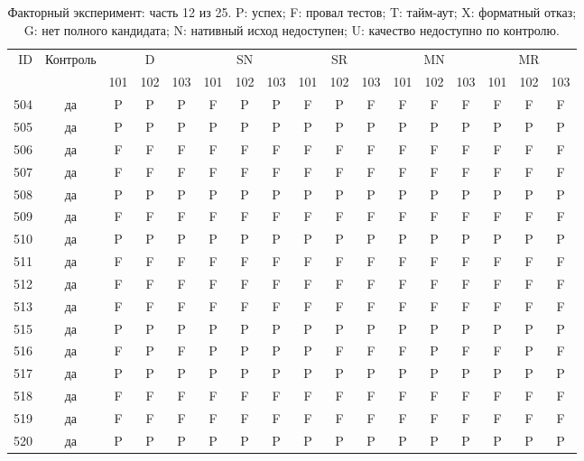 \begin{table}[p]\centering\footnotesize
\setlength{\tabcolsep}{3pt}
\caption{Факторный эксперимент: часть 12 из 25. P: успех; F: провал тестов; T: тайм-аут; X: форматный отказ; G: нет полного кандидата; N: нативный исход недоступен; U: качество недоступно по контролю.}
\begin{tabular*}{\textwidth}{@{\extracolsep{\fill}}rcccccccccccccccc}\toprule
ID & Контроль & \multicolumn{3}{c}{D} & \multicolumn{3}{c}{SN} & \multicolumn{3}{c}{SR} & \multicolumn{3}{c}{MN} & \multicolumn{3}{c}{MR}\\
\cmidrule(lr){3-5}\cmidrule(lr){6-8}\cmidrule(lr){9-11}\cmidrule(lr){12-14}\cmidrule(lr){15-17}
 & & 101 & 102 & 103 & 101 & 102 & 103 & 101 & 102 & 103 & 101 & 102 & 103 & 101 & 102 & 103\\\midrule
504 & да & P & P & P & F & P & P & F & P & F & F & F & F & F & F & F\\
505 & да & P & P & P & P & P & P & P & P & P & P & P & P & P & P & P\\
506 & да & F & F & F & F & F & F & F & F & F & F & F & F & F & F & F\\
507 & да & F & F & F & F & F & F & F & F & F & F & F & F & F & F & F\\
508 & да & P & P & P & P & P & P & P & P & P & P & P & P & P & P & P\\
509 & да & F & F & F & F & F & F & F & F & F & F & F & F & F & F & F\\
510 & да & P & P & P & P & P & P & P & P & P & P & P & P & P & P & P\\
511 & да & F & F & F & F & F & F & F & F & F & F & F & F & F & F & F\\
512 & да & F & F & F & F & F & F & F & F & F & F & F & F & F & F & F\\
513 & да & F & F & F & F & F & F & F & F & F & F & F & F & F & F & F\\
515 & да & P & P & P & P & P & P & P & P & P & P & P & P & P & P & P\\
516 & да & F & P & F & P & P & P & P & F & F & F & P & F & F & P & F\\
517 & да & P & P & P & P & P & P & P & P & P & P & P & P & P & P & P\\
518 & да & F & F & F & F & F & F & F & F & F & F & F & F & F & F & F\\
519 & да & F & F & F & F & F & F & F & F & F & F & F & F & F & F & F\\
520 & да & P & P & P & P & P & P & P & P & P & P & P & P & P & P & P\\

\end{tabular*}
\end{table}
